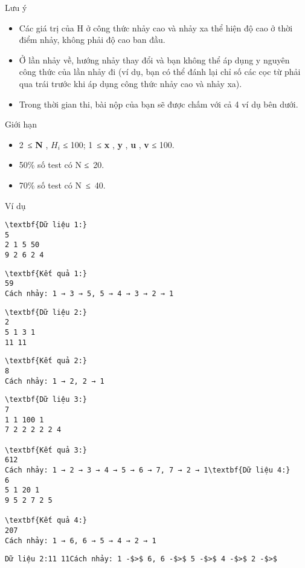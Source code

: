 Lưu ý  
\begin{itemize}
	\item     Các giá trị của H ở công thức nhảy cao và nhảy xa thể hiện độ cao ở thời điểm nhảy, không phải độ cao ban đầu.   
	\item     Ở lần nhảy về, hướng nhảy thay đổi và bạn không thể áp dụng y nguyên công thức của lần nhảy đi (ví dụ, bạn có thể đánh lại chỉ số các cọc từ phải qua trái trước khi áp dụng công thức nhảy cao và nhảy xa).   
	\item     Trong thời gian thi, bài nộp của bạn sẽ được chấm với cả 4 ví dụ bên dưới.   
\end{itemize}
   Giới hạn  
\begin{itemize}
	\item     2 ≤    \textbf{     N    }    ,    \textbf{     $H_{i}$}    ≤ 100; 1 ≤    \textbf{     x    }    ,    \textbf{     y    }    ,    \textbf{     u    }    ,    \textbf{     v    }    ≤ 100.   
	\item     50\% số test có N ≤ 20.   
	\item     70\% số test có N ≤ 40.   
\end{itemize}
   Ví dụ  
\begin{verbatim}
\textbf{Dữ liệu 1:}
5
2 1 5 50
9 2 6 2 4\end{verbatim}
\begin{verbatim}
\textbf{Kết quả 1:}
59
Cách nhảy: 1 → 3 → 5, 5 → 4 → 3 → 2 → 1\end{verbatim}
\begin{verbatim}
\textbf{Dữ liệu 2:}
2
5 1 3 1
11 11\end{verbatim}
\begin{verbatim}
\textbf{Kết quả 2:}
8
Cách nhảy: 1 → 2, 2 → 1\end{verbatim}
\begin{verbatim}
\textbf{Dữ liệu 3:}
7
1 1 100 1
7 2 2 2 2 2 4

\textbf{Kết quả 3:}
612
Cách nhảy: 1 → 2 → 3 → 4 → 5 → 6 → 7, 7 → 2 → 1\textbf{Dữ liệu 4:}
6
5 1 20 1
9 5 2 7 2 5

\textbf{Kết quả 4:}
207
Cách nhảy: 1 → 6, 6 → 5 → 4 → 2 → 1\end{verbatim}
\begin{verbatim}
Dữ liệu 2:11 11Cách nhảy: 1 -$>$ 6, 6 -$>$ 5 -$>$ 4 -$>$ 2 -$>$ \end{verbatim}